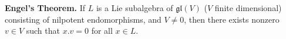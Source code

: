 \textbf{Engel's Theorem.} If $L$ is a Lie subalgebra of $\mathfrak{gl}(V)$ ($V$ finite dimensional) consisting of nilpotent endomorphisms, and $V \neq 0$, then there exists nonzero $v \in V$ such that $x.v = 0$ for all $x \in L$.
